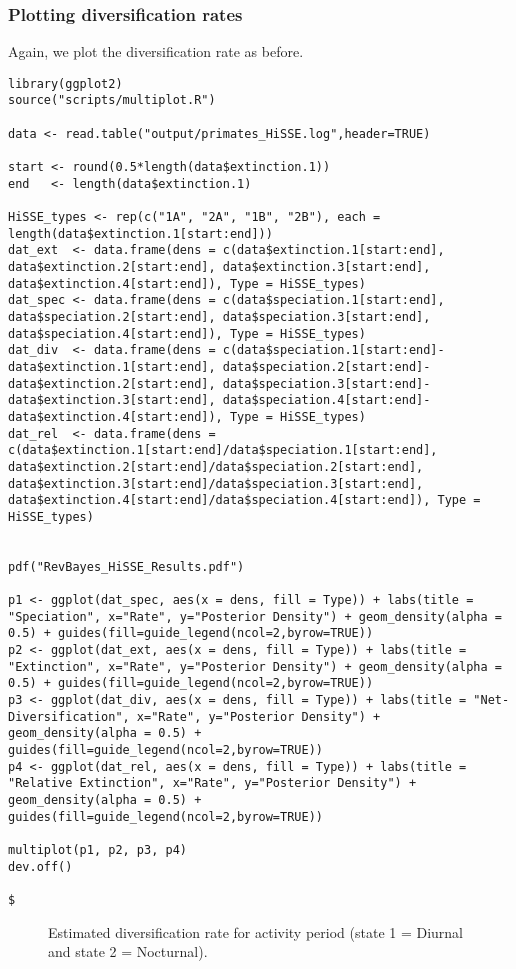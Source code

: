 \subsubsection{Plotting diversification rates}
Again, we plot the diversification rate as before.
{\tt \begin{snugshade*}
\begin{lstlisting}
library(ggplot2)
source("scripts/multiplot.R")

data <- read.table("output/primates_HiSSE.log",header=TRUE)

start <- round(0.5*length(data$extinction.1))
end   <- length(data$extinction.1)

HiSSE_types <- rep(c("1A", "2A", "1B", "2B"), each = length(data$extinction.1[start:end]))
dat_ext  <- data.frame(dens = c(data$extinction.1[start:end], data$extinction.2[start:end], data$extinction.3[start:end], data$extinction.4[start:end]), Type = HiSSE_types)
dat_spec <- data.frame(dens = c(data$speciation.1[start:end], data$speciation.2[start:end], data$speciation.3[start:end], data$speciation.4[start:end]), Type = HiSSE_types)
dat_div  <- data.frame(dens = c(data$speciation.1[start:end]-data$extinction.1[start:end], data$speciation.2[start:end]-data$extinction.2[start:end], data$speciation.3[start:end]-data$extinction.3[start:end], data$speciation.4[start:end]-data$extinction.4[start:end]), Type = HiSSE_types)
dat_rel  <- data.frame(dens = c(data$extinction.1[start:end]/data$speciation.1[start:end], data$extinction.2[start:end]/data$speciation.2[start:end], data$extinction.3[start:end]/data$speciation.3[start:end], data$extinction.4[start:end]/data$speciation.4[start:end]), Type = HiSSE_types)


pdf("RevBayes_HiSSE_Results.pdf")

p1 <- ggplot(dat_spec, aes(x = dens, fill = Type)) + labs(title = "Speciation", x="Rate", y="Posterior Density") + geom_density(alpha = 0.5) + guides(fill=guide_legend(ncol=2,byrow=TRUE))
p2 <- ggplot(dat_ext, aes(x = dens, fill = Type)) + labs(title = "Extinction", x="Rate", y="Posterior Density") + geom_density(alpha = 0.5) + guides(fill=guide_legend(ncol=2,byrow=TRUE))
p3 <- ggplot(dat_div, aes(x = dens, fill = Type)) + labs(title = "Net-Diversification", x="Rate", y="Posterior Density") + geom_density(alpha = 0.5) + guides(fill=guide_legend(ncol=2,byrow=TRUE))
p4 <- ggplot(dat_rel, aes(x = dens, fill = Type)) + labs(title = "Relative Extinction", x="Rate", y="Posterior Density") + geom_density(alpha = 0.5) + guides(fill=guide_legend(ncol=2,byrow=TRUE))

multiplot(p1, p2, p3, p4)
dev.off()

$
\end{lstlisting}
\end{snugshade*}}
\begin{figure}[h!]
\centering
{}
\caption{\small Estimated diversification rate for activity period (state 1 = Diurnal and state 2 = Nocturnal).}
\label{fig:div_rates_HiSSE}
\end{figure}


